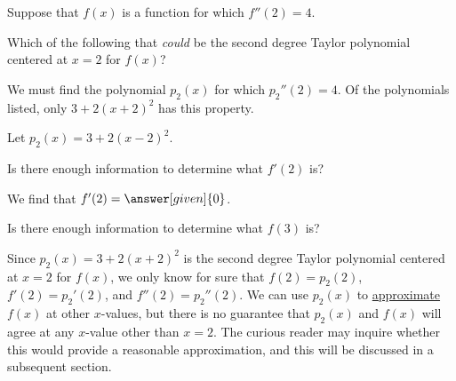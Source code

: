 \documentclass{ximera}
\begin{document}
\begin{question}
Suppose that $f(x)$ is a function for which $f''(2) = 4$.  

\begin{question}
Which of the following that \emph{could} be the second degree Taylor polynomial centered at $x=2$ for $f(x)$?

\begin{multipleChoice}
\end{multipleChoice}

\begin{feedback}
We must find the polynomial $p_2(x)$ for which $p_2''(2) = 4$.  Of the polynomials listed, only $3+2(x+2)^2$ has this property.
\end{feedback}

\begin{question}
Let $p_2(x) =3+2(x-2)^2$.  

Is there enough information to determine what $f'(2)$ is?

\begin{multipleChoice}
\end{multipleChoice}

\begin{question}
We find that $f'(2) = \answer[given]{0}$.
\end{question}

Is there enough information to determine what $f(3)$ is?

\begin{multipleChoice}
\end{multipleChoice}


\end{question}
\begin{feedback}
Since $p_2(x) = 3+2(x+2)^2$ is the second degree Taylor polynomial centered at $x=2$ for $f(x)$, we only know for sure that $f(2)=p_2(2)$, $f'(2)=p_2'(2)$, and $f''(2)=p_2''(2)$.  We can use $p_2(x)$ to \underline{approximate} $f(x)$ at other $x$-values, but there is no guarantee that $p_2(x)$ and $f(x)$ will agree at any $x$-value other than $x=2$.  The curious reader may inquire whether this would provide a reasonable approximation, and this will be discussed in a subsequent section.
\end{feedback}

\end{question}


\end{question}
\end{document}

